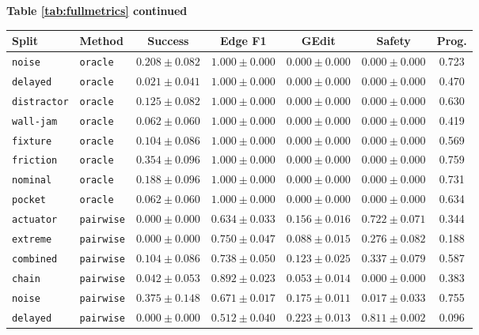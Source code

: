\documentclass{article}
\begin{document}
\begin{center}
\textbf{Table \ref{tab:fullmetrics} continued}\\[0.4ex]
\begin{tabular}{llccccc}
\toprule
Split & Method & Success & Edge F1 & GEdit & Safety & Prog. \\
\midrule
\texttt{noise} & \texttt{oracle} & $0.208 \pm 0.082$ & $1.000 \pm 0.000$ & $0.000 \pm 0.000$ & $0.000 \pm 0.000$ & 0.723 \\
\texttt{delayed} & \texttt{oracle} & $0.021 \pm 0.041$ & $1.000 \pm 0.000$ & $0.000 \pm 0.000$ & $0.000 \pm 0.000$ & 0.470 \\
\texttt{distractor} & \texttt{oracle} & $0.125 \pm 0.082$ & $1.000 \pm 0.000$ & $0.000 \pm 0.000$ & $0.000 \pm 0.000$ & 0.630 \\
\texttt{wall-jam} & \texttt{oracle} & $0.062 \pm 0.060$ & $1.000 \pm 0.000$ & $0.000 \pm 0.000$ & $0.000 \pm 0.000$ & 0.419 \\
\texttt{fixture} & \texttt{oracle} & $0.104 \pm 0.086$ & $1.000 \pm 0.000$ & $0.000 \pm 0.000$ & $0.000 \pm 0.000$ & 0.569 \\
\texttt{friction} & \texttt{oracle} & $0.354 \pm 0.096$ & $1.000 \pm 0.000$ & $0.000 \pm 0.000$ & $0.000 \pm 0.000$ & 0.759 \\
\texttt{nominal} & \texttt{oracle} & $0.188 \pm 0.096$ & $1.000 \pm 0.000$ & $0.000 \pm 0.000$ & $0.000 \pm 0.000$ & 0.731 \\
\texttt{pocket} & \texttt{oracle} & $0.062 \pm 0.060$ & $1.000 \pm 0.000$ & $0.000 \pm 0.000$ & $0.000 \pm 0.000$ & 0.634 \\
\texttt{actuator} & \texttt{pairwise} & $0.000 \pm 0.000$ & $0.634 \pm 0.033$ & $0.156 \pm 0.016$ & $0.722 \pm 0.071$ & 0.344 \\
\texttt{extreme} & \texttt{pairwise} & $0.000 \pm 0.000$ & $0.750 \pm 0.047$ & $0.088 \pm 0.015$ & $0.276 \pm 0.082$ & 0.188 \\
\texttt{combined} & \texttt{pairwise} & $0.104 \pm 0.086$ & $0.738 \pm 0.050$ & $0.123 \pm 0.025$ & $0.337 \pm 0.079$ & 0.587 \\
\texttt{chain} & \texttt{pairwise} & $0.042 \pm 0.053$ & $0.892 \pm 0.023$ & $0.053 \pm 0.014$ & $0.000 \pm 0.000$ & 0.383 \\
\texttt{noise} & \texttt{pairwise} & $0.375 \pm 0.148$ & $0.671 \pm 0.017$ & $0.175 \pm 0.011$ & $0.017 \pm 0.033$ & 0.755 \\
\texttt{delayed} & \texttt{pairwise} & $0.000 \pm 0.000$ & $0.512 \pm 0.040$ & $0.223 \pm 0.013$ & $0.811 \pm 0.002$ & 0.096 \\

\end{tabular}
\end{center}
\end{document}
